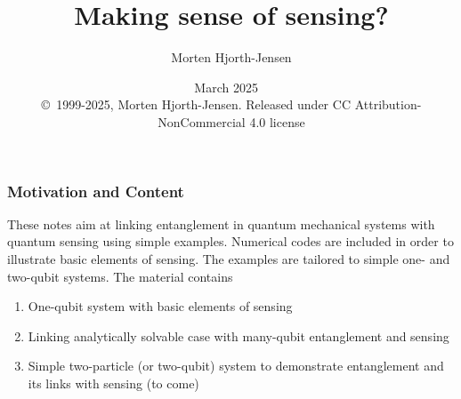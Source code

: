 \documentclass{beamer}
\begin{document}

\newcommand{\exercisesection}[1]{\subsection*{#1}}







\title{Making sense of sensing? }


\author{Morten Hjorth-Jensen}

\date{March 2025
\ \\ 
{\tiny \copyright\ 1999-2025, Morten Hjorth-Jensen. Released under CC Attribution-NonCommercial 4.0 license}
}

\begin{frame}
\titlepage
\end{frame}

\begin{frame}
\frametitle{Motivation and Content}

These notes aim at linking entanglement in quantum mechanical systems
with quantum sensing using simple examples.  Numerical codes are
included in order to illustrate basic elements of sensing.  The
examples are tailored to simple one- and two-qubit systems. The
material contains
\begin{enumerate}
\item One-qubit system with basic elements of sensing

\item Linking analytically solvable case with many-qubit entanglement and sensing

\item Simple two-particle (or two-qubit) system to demonstrate entanglement and its links with sensing (to come)
\end{enumerate}

\noindent
\end{frame}
\end{document}
